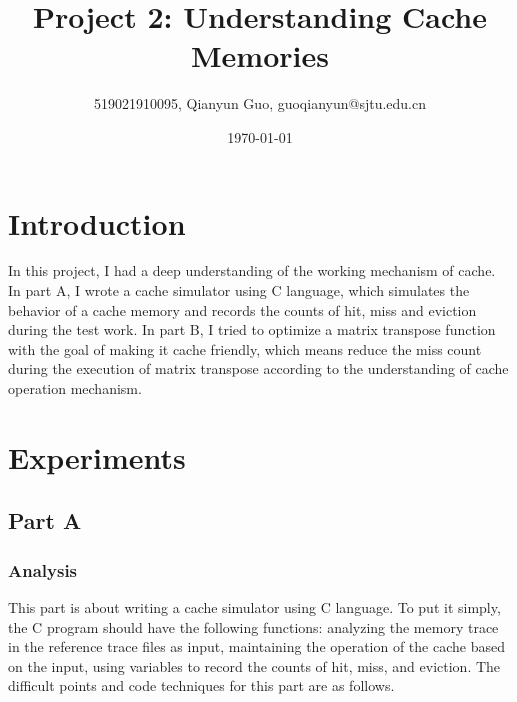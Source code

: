 \documentclass{article}
\title{\textbf{Project 2:  Understanding Cache Memories}} %
\author{519021910095, Qianyun Guo, guoqianyun@sjtu.edu.cn } %
\date{\today} %
\begin{document}
\maketitle %

\section{Introduction}

In this project, I had a deep understanding of the working mechanism of cache. In part A, I wrote a cache simulator using C language, which simulates the behavior of a cache memory and records the counts of hit, miss and eviction during the test work. In part B, I tried to optimize a matrix transpose function with the goal of making it cache friendly, which means reduce the miss count during the execution of matrix transpose according to the understanding of cache operation mechanism.

\section{Experiments}

\subsection{Part A}

\subsubsection{Analysis}

This part is about writing a cache simulator using C language. To put it simply, the C program should have the following functions: analyzing the memory trace in the reference trace files as input, maintaining the operation of the cache based on the input, using variables to record the counts of hit, miss, and eviction. The difficult points and code techniques for this part are as follows.\\
\end{document}
